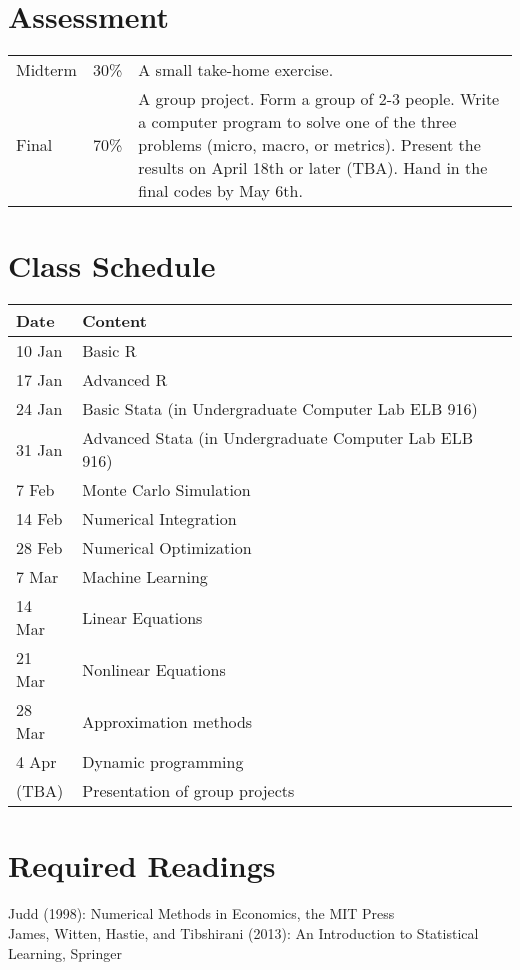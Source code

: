 \documentclass[11pt]{article}
\begin{document}
\section{Assessment}
\begin{tabular}{p{0.5in}p{0.5in}p{5in}}
   Midterm & 30\% & A small take-home exercise. \\
   Final  & 70\%  & A group project. Form a group of 2-3 people. Write a computer program to solve one of the three problems (micro, macro, or metrics). Present the results on April 18th or later (TBA). Hand in the final codes by May 6th.
\end{tabular}

\section{Class Schedule}
\begin{tabular}{p{1in}p{4in}}
  \hline
  Date & Content \\
  \hline
  10 Jan & Basic R \\
  17 Jan & Advanced R \\
  24 Jan & Basic Stata (in Undergraduate Computer Lab ELB 916) \\
  31 Jan & Advanced Stata (in Undergraduate Computer Lab ELB 916)  \\
  7 Feb &  Monte Carlo Simulation\\
  14 Feb & Numerical Integration \\
  28 Feb & Numerical Optimization  \\
  7 Mar &  Machine Learning  \\
  14 Mar & Linear Equations \\
  21 Mar & Nonlinear Equations \\
  28 Mar & Approximation methods \\
  4 Apr & Dynamic programming \\
  (TBA) & Presentation of group projects \\
  \hline
\end{tabular}





\section{Required Readings}
Judd (1998): Numerical Methods in Economics, the MIT Press \\
James, Witten, Hastie, and Tibshirani (2013): An Introduction to Statistical Learning, Springer

% 


\end{document}
